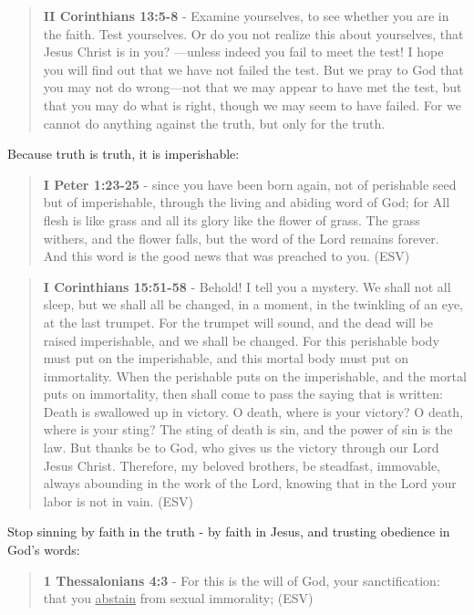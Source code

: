 \documentclass[11pt]{article}
\begin{document}
\begin{quote}
\textbf{II Corinthians 13:5-8} - Examine yourselves, to see whether you are in the faith. Test yourselves. Or do you not realize this about yourselves, that Jesus Christ is in you? —unless indeed you fail to meet the test! I hope you will find out that we have not failed the test. But we pray to God that you may not do wrong—not that we may appear to have met the test, but that you may do what is right, though we may seem to have failed. For we cannot do anything against the truth, but only for the truth.
\end{quote}

Because truth is truth, it is imperishable:

\begin{quote}
\textbf{I Peter 1:23-25} - since you have been born again, not of perishable seed but of imperishable, through the living and abiding word of God; for All flesh is like grass and all its glory like the flower of grass. The grass withers, and the flower falls, but the word of the Lord remains forever. And this word is the good news that was preached to you. (ESV)
\end{quote}

\begin{quote}
\textbf{I Corinthians 15:51-58} - Behold! I tell you a mystery. We shall not all sleep, but we shall all be changed, in a moment, in the twinkling of an eye, at the last trumpet. For the trumpet will sound, and the dead will be raised imperishable, and we shall be changed. For this perishable body must put on the imperishable, and this mortal body must put on immortality. When the perishable puts on the imperishable, and the mortal puts on immortality, then shall come to pass the saying that is written: Death is swallowed up in victory. O death, where is your victory? O death, where is your sting? The sting of death is sin, and the power of sin is the law. But thanks be to God, who gives us the victory through our Lord Jesus Christ. Therefore, my beloved brothers, be steadfast, immovable, always abounding in the work of the Lord, knowing that in the Lord your labor is not in vain. (ESV)
\end{quote}

Stop sinning by faith in the truth - by faith in Jesus, and trusting obedience in God's words:

\begin{quote}
\textbf{1 Thessalonians 4:3} -  For this is the will of God, your sanctification: that you \uline{abstain} from sexual immorality;  (ESV)
\end{quote}
\end{document}
